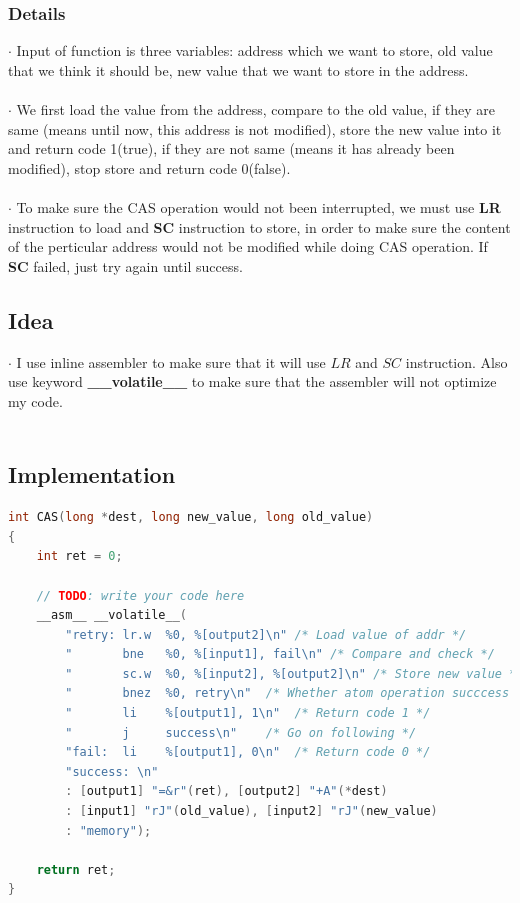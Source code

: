 \documentclass{article}
\begin{document}
\subsubsection{Details}
$\cdot$ Input of function is three variables: address which we want to store, old value that we think it should be, new value that we want to store in the address.\\\\
$\cdot$ We first load the value from the address, compare to the old value, if they are same (means until now, this address is not modified), store the new value into it and return code 1(true), if they are not same (means it has already been modified), stop store and return code 0(false).\\\\
$\cdot$ To make sure the CAS operation would not been interrupted, we must use \textbf{LR} instruction to load and \textbf{SC} instruction to store, in order to make sure the content of the perticular address would not be modified while doing CAS operation. If \textbf{SC} failed, just try again until success.
\subsection{Idea}
$\cdot$ I use inline assembler to make sure that it will use $LR$ and $SC$ instruction. Also use keyword \textbf{\_\_volatile\_\_} to make sure that the assembler will not optimize my code.\\\\
\subsection{Implementation}
\begin{lstlisting}[language=c++]
int CAS(long *dest, long new_value, long old_value)
{
    int ret = 0;

    // TODO: write your code here
    __asm__ __volatile__(
        "retry: lr.w  %0, %[output2]\n" /* Load value of addr */
        "       bne   %0, %[input1], fail\n" /* Compare and check */
        "       sc.w  %0, %[input2], %[output2]\n" /* Store new value */
        "       bnez  %0, retry\n"  /* Whether atom operation succcess */
        "       li    %[output1], 1\n"  /* Return code 1 */
        "       j     success\n"    /* Go on following */
        "fail:  li    %[output1], 0\n"  /* Return code 0 */
        "success: \n"
        : [output1] "=&r"(ret), [output2] "+A"(*dest)
        : [input1] "rJ"(old_value), [input2] "rJ"(new_value)
        : "memory");

    return ret;
}
\end{lstlisting}
\pagebreak
\end{document}
